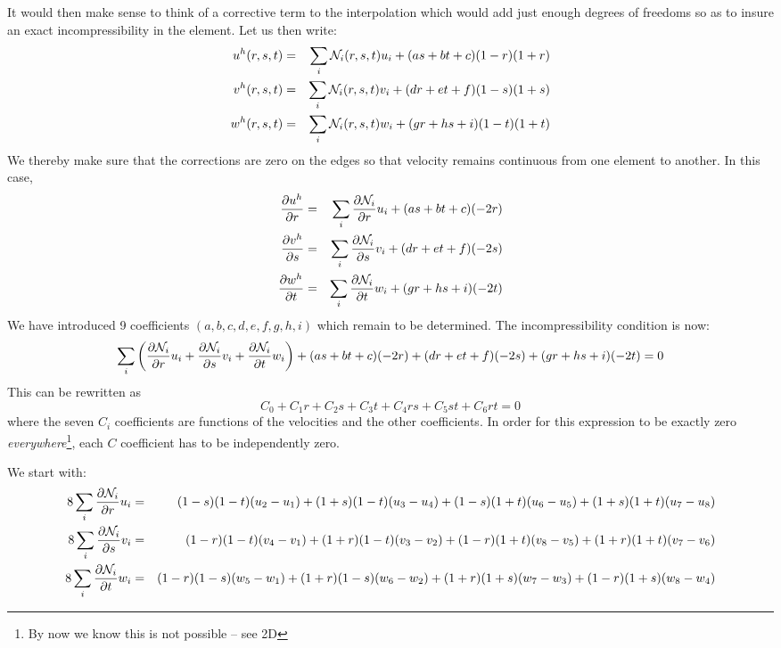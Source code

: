 It would then make sense to think of a corrective term to the interpolation
which would add just enough degrees of freedoms so as to insure an exact
incompressibility in the element.
Let us then write:
\begin{eqnarray}
u^h(r,s,t)&=&\sum_i {\mathcal{N}}_i(r,s,t) u_i + (a s + b t +c)(1-r)(1+r) \nonumber\\
v^h(r,s,t)&=&\sum_i {\mathcal{N}}_i(r,s,t) v_i + (d r + e t +f)(1-s)(1+s) \nonumber\\
w^h(r,s,t)&=&\sum_i {\mathcal{N}}_i(r,s,t) w_i + (g r + h s +i)(1-t)(1+t) \nonumber
\end{eqnarray}
We thereby make sure that the corrections are zero on the edges 
so that velocity remains continuous from one element to another.
In this case,
\begin{eqnarray}
\frac{\partial u^h}{\partial r}&=&\sum_i \frac{\partial {\mathcal{N}}_i}{\partial r} u_i + (a s + b t +c)(-2r)\nonumber\\
\frac{\partial v^h}{\partial s}&=&\sum_i \frac{\partial {\mathcal{N}}_i}{\partial s} v_i + (d r + e t +f)(-2s)\nonumber\\
\frac{\partial w^h}{\partial t}&=&\sum_i \frac{\partial {\mathcal{N}}_i}{\partial t} w_i + (g r + h s +i)(-2t)\nonumber
\end{eqnarray}
We have introduced 9 coefficients  $(a,b,c,d,e,f,g,h,i)$ which remain to be determined.
The incompressibility condition is now:
\[
\sum_i \left(  
\frac{\partial {\mathcal{N}}_i}{\partial r} u_i+
\frac{\partial {\mathcal{N}}_i}{\partial s} v_i+
\frac{\partial {\mathcal{N}}_i}{\partial t} w_i
\right)
+ (a s + b t +c) (-2r) + (d r + e t +f)(-2s) + (g r + h s +i)(-2t) 
=0
\]
This can be rewritten as
\[
C_0  + C_1 r + C_2 s + C_3 t + C_4 rs + C_5 st + C_6 rt = 0
\]
where the seven $C_i$ coefficients are functions of the velocities and the other coefficients.
In order for this expression to be exactly zero {\it everywhere}\footnote{By now we know 
this is not possible -- see 2D}, each $C$ coefficient has
to be independently zero.

We start with:
\begin{eqnarray}
8\sum_i \frac{\partial {\mathcal{N}}_i}{\partial r} u_i 
&=& (1-s)(1-t)(u_2-u_1)
+ (1+s)(1-t)(u_3-u_4)
+ (1-s)(1+t)(u_6-u_5)
+ (1+s)(1+t)(u_7-u_8) \nonumber\\
8\sum_i \frac{\partial {\mathcal{N}}_i}{\partial s} v_i 
&=& (1-r)(1-t)(v_4-v_1)
+ (1+r)(1-t)(v_3-v_2)
+ (1-r)(1+t)(v_8-v_5)
+ (1+r)(1+t)(v_7-v_6) \nonumber\\
8\sum_i \frac{\partial {\mathcal{N}}_i}{\partial t} w_i 
&=& (1-r)(1-s)(w_5-w_1)
+ (1+r)(1-s)(w_6-w_2)
+ (1+r)(1+s)(w_7-w_3)
+ (1-r)(1+s)(w_8-w_4) \nonumber
\end{eqnarray}


